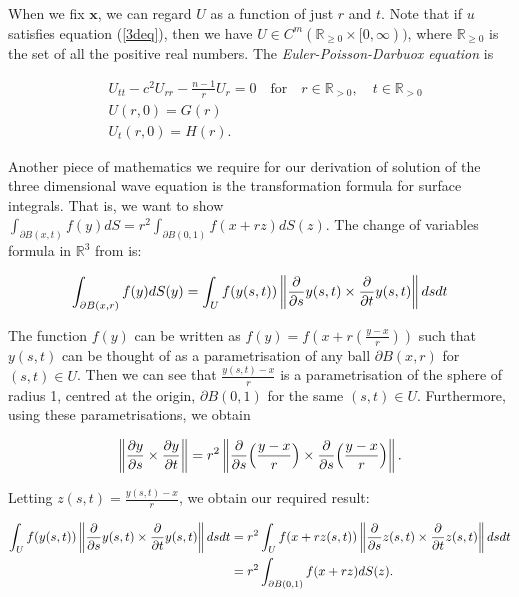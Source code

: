 \documentclass[a4paper, 12pt]{article}
\numberwithin{equation}{section}
\begin{document}
When we fix $\boldsymbol{x}$, we can regard $U$ as a function of just $r$ and $t$. Note that if $u$ satisfies equation
(\ref{3deq}), then we have $U \in C^m(\mathbb{R}_{\ge 0}\times[0,\infty))$, where $\mathbb{R}_{\ge 0}$ is the set of all the positive real numbers. The \emph{Euler-Poisson-Darbuox equation} is

\begin{equation} \label{EPDeq}
    \begin{aligned}
        &U_{tt}-c^2U_{rr}-\frac{n-1}{r}U_r=0 \quad \textrm {for} \quad r \in \mathbb{R}_{>0}, \quad t \in \mathbb{R}_{>0}\\
        &U(r, 0)=G(r)\\
        &U_t(r,0)=H(r).
    \end{aligned}
\end{equation}

Another piece of mathematics we require for our derivation of solution of the three dimensional wave equation is the transformation formula for surface integrals. That is,
we want to show $\int_{\partial B(x,t)}f(y)dS=r^2\int_{\partial B(0,1)} f(x+rz)dS(z)$. The change of variables formula in $\mathbb{R}^3$ from \cite{LooSter} is:

\begin{equation*}
    \int_{\partial B(x,r)}f(y)dS(y)=\int_U f(y(s,t))\left\| \diffp[1]{}{s}y(s, t) \times \diffp[1]{}{t}y(s, t) \right \|ds dt
\end{equation*}

The function $f(y)$ can be written as $f(y)=f(x+r(\frac{y-x}{r}))$ such that $y(s,t)$ can be thought of as a parametrisation of any ball $\partial B(x,r)$ for $(s,t)\in U$. Then we can see
that $\frac{y(s,t)-x}{r}$ is a parametrisation of the sphere of radius 1, centred at the origin, $\partial B(0,1)$ for the same $(s,t)\in U$. Furthermore, using these parametrisations, we obtain

\begin{equation*}
    \left \| \diffp[1]{y}{s} \times \diffp[1]{y}{t} \right \| =r^2 \left \| \diffp[1]{}{s}\Big(\frac{y-x}{r}\Big) \times \diffp[1]{}{s}\Big( \frac{y-x}{r}\Big) \right \|.
\end{equation*}

Letting $z(s,t)=\frac{y(s,t)-x}{r}$, we obtain our required result:

\begin{equation*}
    \begin{aligned}
    \int_U f(y(s,t)) \left \| \diffp[1]{}{s}y(s, t) \times \diffp{}{t}y(s, t) \right \| dsdt&=r^2\int_U f(x+rz(s,t)) \left \| \diffp[1]{}{s}z(s, t) \times \diffp[1]{}{t}z(s, t) \right \| dsdt\\
    &=r^2\int_{\partial B(0,1)}f(x+rz)dS(z).
    \end{aligned}
\end{equation*}
\end{document}
